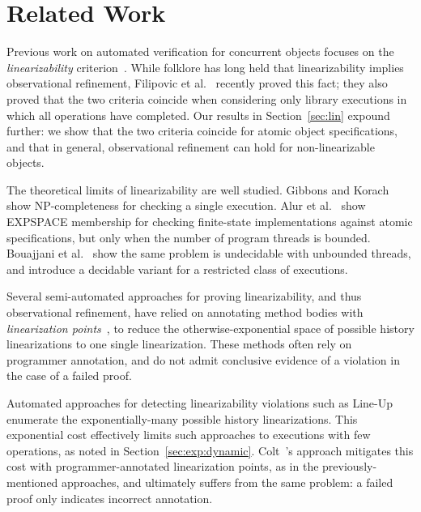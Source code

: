 \section{Related Work}
\label{sec:related}


Previous work on automated verification for concurrent objects focuses on the
\emph{linearizability} criterion~\citep{journals/toplas/HerlihyW90}. While
folklore has long held that linearizability implies observational refinement,
Filipovic et al.~\cite{journals/tcs/FilipovicORY10} recently proved this fact;
they also proved that the two criteria coincide when considering only library
executions in which all operations have completed. Our results in
Section~\ref{sec:lin} expound further: we show that the two criteria coincide
for atomic object specifications, and that in general, observational refinement
can hold for non-linearizable objects.

The theoretical limits of linearizability are well studied. Gibbons
and Korach~\cite{journals/siamcomp/GibbonsK97} show NP-completeness for
checking a single execution. Alur et al.~\cite{journals/iandc/AlurMP00} show
EXPSPACE membership for checking finite-state implementations against atomic
specifications, but only when the number of program threads is bounded.
Bouajjani et al.~\cite{conf/esop/BouajjaniEEH13} show the same problem is
undecidable with unbounded threads, and introduce a decidable variant for a
restricted class of executions.


Several semi-automated approaches for proving linearizability, and thus
observational refinement, have relied on annotating method bodies with
\emph{linearization points}~\cite{conf/cav/AmitRRSY07, conf/fm/LiuCLS09,
conf/podc/OHearnRVYY10, conf/cav/Vafeiadis10, conf/icse/Zhang11a}, to reduce the otherwise-exponential
space of possible history linearizations to one single linearization. These
methods often rely on programmer annotation, and do not admit conclusive
evidence of a violation in the case of a failed proof.

Automated approaches for detecting linearizability violations such as
Line-Up~\cite{conf/pldi/BurckhardtDMT10} enumerate the exponentially-many
possible history linearizations. This exponential cost effectively limits such
approaches to executions with few operations, as noted in
Section~\ref{sec:exp:dynamic}. Colt~\cite{conf/oopsla/ShachamBASVY11}'s
approach mitigates this cost with programmer-annotated linearization points, as
in the previously-mentioned approaches, and ultimately suffers from the same
problem: a failed proof only indicates incorrect annotation.
